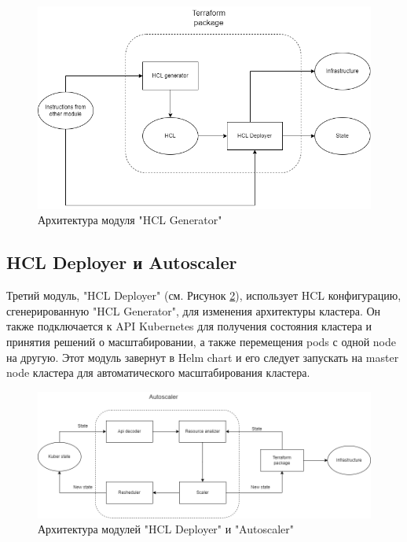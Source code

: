 \begin{figure}[h]
  \centering
  \includegraphics[scale=0.6]{img/2.png}
  \caption{Архитектура модуля "HCL Generator"}
  \label{fig:hclg}
\end{figure}

\subsection{HCL Deployer и Autoscaler}

Третий модуль, "HCL Deployer" (см. Рисунок \ref{fig:hdas}), использует HCL
конфигурацию, сгенерированную "HCL Generator", для изменения архитектуры
кластера. Он также подключается к API Kubernetes для получения состояния
кластера и принятия решений о масштабировании, а также перемещения pods с одной
node на другую. Этот модуль завернут в Helm chart и его следует запускать на
master node кластера для автоматического масштабирования кластера.

\begin{figure}[h]
  \centering
  \includegraphics[scale=0.5]{img/3.png}
  \caption{Архитектура модулей "HCL Deployer" и "Autoscaler"}
  \label{fig:hdas}
\end{figure}

\vspace{15mm}

